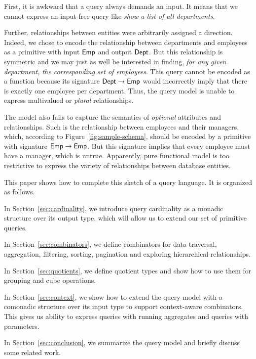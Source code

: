 First, it is awkward that a query always demands an input.  It means that we
cannot express an input-free query like \emph{show a list of all departments}.

Further, relationships between entities were arbitrarily assigned a direction.
Indeed, we chose to encode the relationship between departments and employees
as a primitive with input $\textup{\textsf{Emp}}$ and output $\textup{\textsf{Dept}}$.  But this relationship is
symmetric and we may just as well be interested in finding, \emph{for any given
department, the corresponding set of employees}.  This query cannot be encoded
as a function because its signature $\textup{\textsf{Dept}} \to \textup{\textsf{Emp}}$ would incorrectly imply
that there is exactly one employee per department.  Thus, the query model
is unable to express multivalued or \emph{plural} relationships.

The model also fails to capture the semantics of \emph{optional} attributes and
relationships.  Such is the relationship between employees and their managers,
which, according to Figure~\ref{fig:sample-schema}, should be encoded by a
primitive with signature $\textup{\textsf{Emp}} \to \textup{\textsf{Emp}}$.  But this signature implies that
every employee must have a manager, which is untrue.  Apparently, pure
functional model is too restrictive to express the variety of relationships
between database entities.

This paper shows how to complete this sketch of a query language.  It is
organized as follows.

In Section~\ref{sec:cardinality}, we introduce query cardinality as a mo\-nadic
structure over its output type, which will allow us to extend our set of
primitive queries.

In Section~\ref{sec:combinators}, we define combinators for data traversal,
aggregation, filtering, sorting, pagination and exploring hierarchical
relationships.

In Section~\ref{sec:quotients}, we define quotient types and show how to use
them for grouping and cube operations.

In Section~\ref{sec:context}, we show how to extend the query model with a
comonadic structure over its input type to support context-aware combinators.
This gives us ability to express queries with running aggregates and queries
with parameters.

In Section~\ref{sec:conclusion}, we summarize the query model and briefly
discuss some related work.

